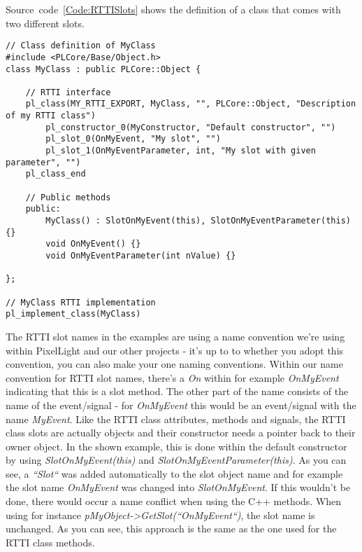 Source~code~\ref{Code:RTTISlots} shows the definition of a class that comes with two different slots.
\begin{lstlisting}[label=Code:RTTISlots,caption={Definition of RTTI class slots with parameters}]
// Class definition of MyClass
#include <PLCore/Base/Object.h>
class MyClass : public PLCore::Object {

	// RTTI interface
	pl_class(MY_RTTI_EXPORT, MyClass, "", PLCore::Object, "Description of my RTTI class")
		pl_constructor_0(MyConstructor, "Default constructor", "")
		pl_slot_0(OnMyEvent, "My slot", "")
		pl_slot_1(OnMyEventParameter, int, "My slot with given parameter", "")
	pl_class_end

	// Public methods
	public:
		MyClass() : SlotOnMyEvent(this), SlotOnMyEventParameter(this) {}
		void OnMyEvent() {}
		void OnMyEventParameter(int nValue) {}

};

// MyClass RTTI implementation
pl_implement_class(MyClass)
\end{lstlisting}
The RTTI slot names in the examples are using a name convention we're using within PixelLight and our other projects - it's up to to whether you adopt this convention, you can also make your one naming conventions. Within our name convention for RTTI slot names, there's a \emph{On} within for example \emph{OnMyEvent} indicating that this is a slot method. The other part of the name consists of the name of the event/signal - for \emph{OnMyEvent} this would be an event/signal with the name \emph{MyEvent}. Like the RTTI class attributes, methods and signals, the RTTI class slots are actually objects and their constructor needs a pointer back to their owner object. In the shown example, this is done within the default constructor by using \emph{SlotOnMyEvent(this)} and \emph{SlotOnMyEventParameter(this)}. As you can see, a \emph{``Slot``} was added automatically to the slot object name and for example the slot name \emph{OnMyEvent} was changed into \emph{SlotOnMyEvent}. If this wouldn't be done, there would occur a name conflict when using the C++ methods. When using for instance \emph{pMyObject->GetSlot(``OnMyEvent``)}, the slot name is unchanged. As you can see, this approach is the same as the one used for the RTTI class methods.

